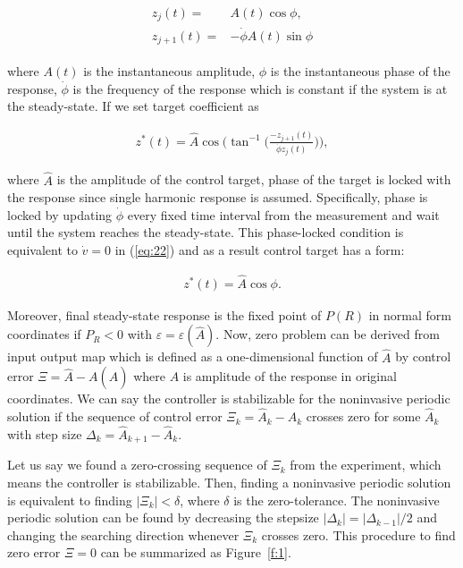 \documentclass[openacc]{rsproca_new}%
\def\epsilon{\varepsilon}
\newcommand{\Eref}[1]{(\ref{#1})}
\newcommand{\Fref}[1]{Figure~\ref{#1}}
\begin{document}
\begin{align}\label{eq:25}
\begin{split}
z_{j}(t)=&A(t)\cos{\phi},\\
z_{j+1}(t)=&-\dot\phi A(t)\sin{\phi}
\end{split}
\end{align}

\noindent where $A(t)$ is the instantaneous amplitude, $\phi$ is the instantaneous phase of the response, $\dot\phi$ is the frequency of the response which is constant if the system is at the steady-state. If we set target coefficient as

\begin{align}\label{eq:26}
z^*(t)=\hat A\cos\Big(\tan^{-1}\Big({\frac{-z_{j+1}(t)}{ \dot \phi z_{j}(t)}}\Big) \Big),
\end{align}

\noindent where $\hat A$ is the amplitude of the control target, phase of the target is locked with the response since single harmonic response is assumed. Specifically, phase is locked by updating $\dot\phi$ every fixed time interval from the measurement and wait until the system reaches the steady-state. This phase-locked condition is equivalent to $\dot v=0$ in \Eref{eq:22} and as a result control target has a form:

\begin{align}\label{eq:tg}
 z^*(t)=\hat A\cos{\phi}.
\end{align}

\noindent Moreover, final steady-state response is the fixed point of $P(R)$ in normal form coordinates if $P_R<0$ with $\epsilon=\epsilon(\hat A)$. Now, zero problem can be derived from input output map which is defined as a one-dimensional function of $\hat A$ by control error $\Xi=\hat A - A(\hat A)$ where $A$ is amplitude of the response in original coordinates. We can say the controller is stabilizable for the noninvasive periodic solution if the sequence of control error $\Xi_k=\hat A_k-A_k$ crosses zero for some $\hat A_k$ with step size $\Delta_k=\hat A_{k+1}-\hat A_{k}$.

Let us say we found a zero-crossing sequence of $\Xi_k$ from the experiment, which means the controller is stabilizable. Then, finding a noninvasive periodic solution is equivalent to finding  $|\Xi_k|<\delta$, where $\delta$ is the zero-tolerance. The noninvasive periodic solution can be found by decreasing the stepsize $|\Delta_k|=|\Delta_{k-1}|/2$ and changing the searching direction whenever $\Xi_k$ crosses zero. This procedure to find zero error $\Xi=0$ can be summarized as \Fref{f:1}.
\end{document}
